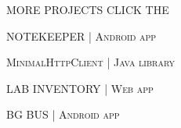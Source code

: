 \begin{minipage}{\linewidth}\vspace{5mm}
{\titleFont\light MORE PROJECTS}\vspace{1mm}\newline
{\subtitleFont \light CLICK THE }\newline

\vspace{\titleBottomMargin}
{\subtitleFont\bold NOTEKEEPER \extraLight\scshape| Android app \href{https://play.google.com/store/apps/details?id=rs.luka.android.studygroup}{\faAndroid} }\newline

\vspace{\ribbonTopMargin}
\ribbonJava \ribbonAndroid \ribbonPlay \ribbonPostgres\newline
\end{minipage}\newline%
%
\begin{minipage}{\linewidth}
{\subtitleFont\bold\scshape MinimalHttpClient \extraLight\scshape| Java library \href{https://github.com/luka-j/MinimalHttpClient}{\faGithub} }\newline

\vspace{\ribbonTopMargin}
\ribbonJava\newline
\end{minipage}\newline%
%
\begin{minipage}{\linewidth}
{\subtitleFont\bold LAB INVENTORY \extraLight\scshape| Web app \href{https://github.com/luka-j/laboratorija-inventar}{\faGithub} }\newline

\vspace{\ribbonTopMargin}
\ribbonKotlin \ribbonSpringBoot \ribbonPostgres \ribbonThymeleaf \newline
\end{minipage}\newline%
%
\begin{minipage}{\linewidth}
{\subtitleFont\bold\scshape BG BUS \extraLight\scshape| Android app \href{https://github.com/luka-j/BgBus}{\faGithub} }\newline

\vspace{\ribbonTopMargin}
\ribbonJava \ribbonAndroid \newline
\end{minipage}\newline%